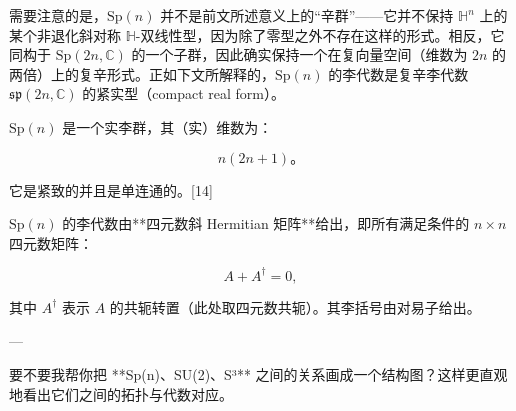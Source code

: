 需要注意的是，$\mathrm{Sp}(n)$ 并不是前文所述意义上的“辛群”——它并不保持 $\mathbb{H}^n$ 上的某个非退化斜对称 $\mathbb{H}$-双线性型，因为除了零型之外不存在这样的形式。相反，它同构于 $\mathrm{Sp}(2n, \mathbb{C})$ 的一个子群，因此确实保持一个在复向量空间（维数为 $2n$ 的两倍）上的复辛形式。正如下文所解释的，$\mathrm{Sp}(n)$ 的李代数是复辛李代数 $\mathfrak{sp}(2n, \mathbb{C})$ 的紧实型（compact real form）。

$\mathrm{Sp}(n)$ 是一个实李群，其（实）维数为：

$$
n(2n+1)。
$$

它是紧致的并且是单连通的。[14]

$\mathrm{Sp}(n)$ 的李代数由**四元数斜 Hermitian 矩阵**给出，即所有满足条件的 $n \times n$ 四元数矩阵：

$$
A + A^{\dagger} = 0,
$$

其中 $A^{\dagger}$ 表示 $A$ 的共轭转置（此处取四元数共轭）。其李括号由对易子给出。

---

要不要我帮你把 **Sp(n)、SU(2)、S³** 之间的关系画成一个结构图？这样更直观地看出它们之间的拓扑与代数对应。
